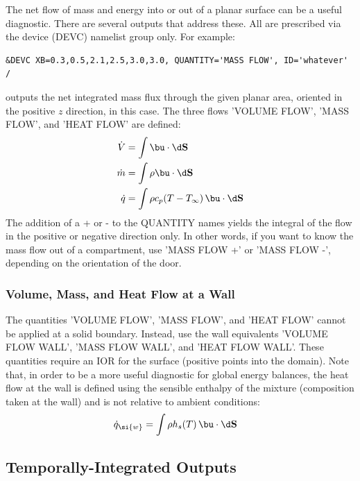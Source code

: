 \documentclass[11pt]{book}
\begin{document}
The net flow of mass and energy into or out of a planar surface can be a useful diagnostic. There are several outputs that address these. All are prescribed via
the device ({\ct DEVC}) namelist group only. For example:

\begin{lstlisting}
&DEVC XB=0.3,0.5,2.1,2.5,3.0,3.0, QUANTITY='MASS FLOW', ID='whatever' /
\end{lstlisting}

\noindent
outputs the net integrated mass flux through the given planar area, oriented in the positive $z$ direction, in this case. The three flows {\ct 'VOLUME FLOW'}, {\ct 'MASS FLOW'},
and {\ct 'HEAT FLOW'} are defined:
\begin{align}
\dot{V} &= \int \bu \cdot \d \mathbf{S}  \\
\dot{m} &= \int \rho \bu \cdot \d \mathbf{S} \\
\dot{q} &= \int \rho c_p (T-T_\infty) \, \bu \cdot \d \mathbf{S}
\end{align}
The addition of a {\ct +} or {\ct -} to the {\ct QUANTITY} names yields the integral of the flow in the positive or negative direction only. In other words, if you want to know the mass flow out of a compartment, use {\ct 'MASS FLOW +'} or {\ct 'MASS FLOW -'}, depending on the orientation of the door.

\subsubsection{Volume, Mass, and Heat Flow at a Wall}
\label{info:wallflows}

The quantities {\ct 'VOLUME FLOW'}, {\ct 'MASS FLOW'}, and {\ct 'HEAT FLOW'} cannot be applied at a solid boundary.  Instead, use the wall equivalents {\ct 'VOLUME FLOW WALL'}, {\ct 'MASS FLOW WALL'}, and {\ct 'HEAT FLOW WALL'}.  These quantities require an {\ct IOR} for the surface (positive points into the domain).  Note that, in order to be a more useful diagnostic for global energy balances, the heat flow at the wall is defined using the sensible enthalpy of the mixture (composition taken at the wall) and is not relative to ambient conditions:
\begin{align}
\dot{q}_{\si{w}} &= \int \rho h_s(T) \, \bu \cdot \d \mathbf{S}
\end{align}

\subsection{Temporally-Integrated Outputs}
\label{info:time_integral}
\end{document}
